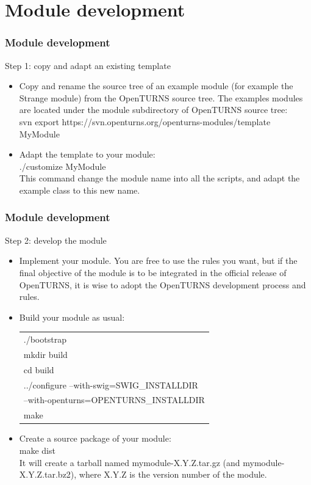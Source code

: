 \documentclass[8pt]{beamer}
\begin{document}
\section[Module development]{Module development}
\begin{frame}
  \frametitle{Module development}
  \begin{block}{Step 1: copy and adapt an existing template}
    \begin{itemize}
    \item Copy and rename the source tree of an example module (for example the Strange module) from the OpenTURNS source tree. The examples modules are located under the module subdirectory of OpenTURNS source tree:\\

      {\ttfamily svn export https://svn.openturns.org/openturns-modules/template MyModule}
    \item Adapt the template to your module:\\
      {\ttfamily ./customize MyModule}\\
      This command change the module name into all the scripts, and adapt the example class to this new name.
    \end{itemize}
  \end{block}
\end{frame}

\begin{frame}
  \frametitle{Module development}
  \begin{block}{Step 2: develop the module}
    \begin{itemize}
    \item Implement your module. You are free to use the rules you want, but if the final objective of the module is to be integrated in the official release of OpenTURNS, it is wise to adopt the OpenTURNS development process and rules.
    \item Build your module as usual:
      \begin{tabular}{l}
        \ttfamily ./bootstrap\\
        \ttfamily mkdir build\\
        \ttfamily cd build\\
        \ttfamily ../configure --with-swig=SWIG\_INSTALLDIR \\
        \ttfamily --with-openturns=OPENTURNS\_INSTALLDIR\\
        \ttfamily make
      \end{tabular}
    \item Create a source package of your module:\\
      {\ttfamily make dist}\\
      It will create a tarball named mymodule-X.Y.Z.tar.gz (and mymodule-X.Y.Z.tar.bz2), where X.Y.Z is the version number of the module.
    \end{itemize}
  \end{block}
\end{frame}
\end{document}

